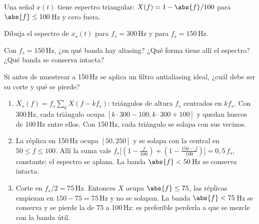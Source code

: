 \documentclass[11pt,a4paper]{scrartcl}
\begin{document}
\begin{ejercicio}
  Una señal $x(t)$ tiene espectro triangular: $X(f)=1-\abs{f}/100$ para $\abs{f}\le100$\,Hz y cero fuera.
  \begin{incisos}[1]
    \item Dibuja el espectro de $x_s(t)$ para $f_s=300$\,Hz y para $f_s=150$\,Hz.
    \item Con $f_s=150$\,Hz, ¿en qué banda hay aliasing? ¿Qué forma tiene allí el espectro? ¿Qué banda se conserva intacta?
    \item Si antes de muestrear a 150\,Hz se aplica un filtro antialiasing ideal, ¿cuál debe ser su corte y qué se pierde?
  \end{incisos}
\end{ejercicio}
\begin{solucion}
  \begin{enumerate}[label=\alph*)]
    \item $X_s(f)=f_s\sum_kX(f-kf_s)$: triángulos de altura $f_s$ centrados en $kf_s$. Con 300\,Hz, cada triángulo ocupa $[k\cdot300-100,k\cdot300+100]$ y quedan huecos de 100\,Hz entre ellos. Con 150\,Hz, cada triángulo se solapa con sus vecinos.
    \item La réplica en 150\,Hz ocupa $[50,250]$ y se solapa con la central en $50\le f\le100$. Allí la suma vale $f_s\big[(1-\frac{f}{100})+(1-\frac{150-f}{100})\big]=0{,}5\,f_s$, constante: el espectro se aplana. La banda $\abs{f}<50$\,Hz se conserva intacta.
    \item Corte en $f_s/2=75$\,Hz. Entonces $X$ ocupa $\abs{f}\le75$, las réplicas empiezan en $150-75=75$\,Hz y no se solapan. La banda $\abs{f}<75$\,Hz se conserva y se pierde la de 75 a 100\,Hz: es preferible perderla a que se mezcle con la banda útil.
  \end{enumerate}
\end{solucion}
\end{document}

